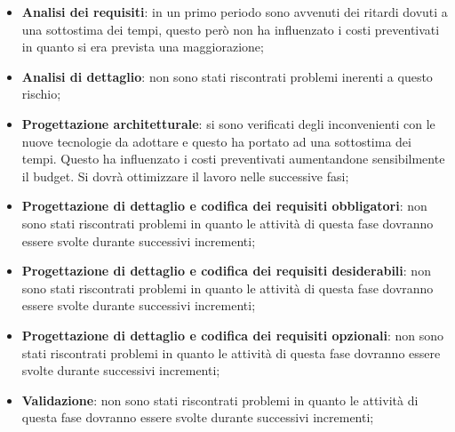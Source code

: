 			\begin{itemize}
				\item \textbf{Analisi dei requisiti}: in un primo periodo sono avvenuti dei ritardi dovuti a una sottostima dei tempi, questo però non ha influenzato i costi preventivati in quanto si era prevista una maggiorazione;
				\item \textbf{Analisi di dettaglio}: non sono stati riscontrati problemi inerenti a questo rischio;
				\item \textbf{Progettazione architetturale}: si sono verificati degli inconvenienti con le nuove tecnologie da adottare e questo ha portato ad una sottostima dei tempi. Questo ha influenzato i costi preventivati aumentandone sensibilmente il budget. Si dovrà ottimizzare il lavoro nelle successive fasi;
				\item \textbf{Progettazione di dettaglio e codifica dei requisiti obbligatori}: non sono stati riscontrati problemi in quanto le attività di questa fase dovranno essere svolte durante successivi incrementi;
				\item \textbf{Progettazione di dettaglio e codifica dei requisiti desiderabili}: non sono stati riscontrati problemi in quanto le attività di questa fase dovranno essere svolte durante successivi incrementi;
				\item \textbf{Progettazione di dettaglio e codifica dei requisiti opzionali}: non sono stati riscontrati problemi in quanto le attività di questa fase dovranno essere svolte durante successivi incrementi;
				\item \textbf{Validazione}: non sono stati riscontrati problemi in quanto le attività di questa fase dovranno essere svolte durante successivi incrementi;
			\end{itemize}




